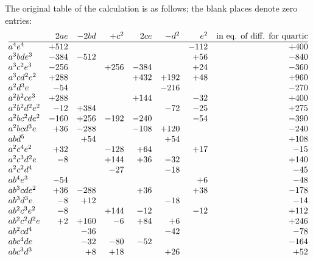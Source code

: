 \documentclass[11pt]{article}
\begin{document}
\medskip

\noindent The original table of the calculation is as follows; the blank places denote zero entries:
\begingroup
\scriptsize
\setlength{\tabcolsep}{2.2pt}
\[
\begin{array}{@{}lrrrrrrr@{}}
 & 2ae & -2bd & +c^2 & 2ce & -d^2 & e^2 &
   \text{in eq. of diff. for quartic}\\
\hline
a^4e^4          & +512 &      &      &      &      & -112 & +400\\
a^3bde^3        & -384 & -512 &      &      &      &  +56 & -840\\
a^3c^2e^3       & -256 &      & +256 & -384 &      &  +24 & -360\\
a^3cd^2e^2      & +288 &      &      & +432 & +192 &  +48 & +960\\
a^2d^3e         &  -54 &      &      &      & -216 &      & -270\\
a^2b^2ce^3      & +288 &      &      & +144 &      &  -32 & +400\\
a^2b^2d^2e^2    &  -12 & +384 &      &      &  -72 &  -25 & +275\\
a^2bc^2de^2     & -160 & +256 & -192 & -240 &      &  -54 & -390\\
a^2bcd^3e       &  +36 & -288 &      & -108 & +120 &      & -240\\
abd^5           &      &  +54 &      &      &  +54 &      & +108\\
a^2c^4e^2       &  +32 &      & -128 &  +64 &      &  +17 &  -15\\
a^2c^3d^2e      &   -8 &      & +144 &  +36 &  -32 &      & +140\\
a^2c^2d^4       &      &      &  -27 &      &  -18 &      &  -45\\
ab^4e^3         &  -54 &      &      &      &      &   +6 &  -48\\
ab^3cde^2       &  +36 & -288 &      &  +36 &      &  +38 & -178\\
ab^3d^3e        &   -8 &  +12 &      &      &  -18 &      &  -14\\
ab^2c^3e^2      &   -8 &      & +144 &  -12 &      &  -12 & +112\\
ab^2c^2d^2e     &   +2 & +160 &   -6 &  +84 &   +6 &      & +246\\
ab^2cd^4        &      &  -36 &      &      &  -42 &      &  -78\\
abc^4de         &      &  -32 &  -80 &  -52 &      &      & -164\\
abc^3d^3        &      &   +8 &  +18 &      &  +26 &      &  +52\\

\end{array}\]
\end{document}
